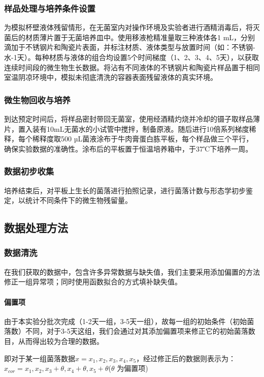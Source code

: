 \documentclass[12pt,a4paper]{ctexart}
\begin{document}
\subsubsection{样品处理与培养条件设置}

为模拟杯壁液体残留情形，在无菌室内对操作环境及实验者进行酒精消毒后，将灭菌后的材质薄片置于无菌培养皿中。使用移液枪精准量取三种液体各1 mL，分别滴加于不锈钢片和陶瓷片表面，并标注材质、液体类型与放置时间（如：不锈钢-水-1天）。每种材质与液体的组合均设置5个时间梯度（1、2、3、4、5天），以获取连续时间段的微生物生长数据。将沾有不同液体的不锈钢片和陶瓷片样品置于相同室温阴凉环境中，模拟未彻底清洗的容器表面残留液体的真实环境。

\subsubsection{微生物回收与培养}

到达预定时间后，将样品密封带回无菌室，使用经酒精灼烧并冷却的镊子取样品薄片，置入装有10mL无菌水的小试管中搅拌，制备原液。随后进行10倍系列梯度稀释，每个稀释度取500 µL菌液涂布于牛肉膏蛋白胨平板，每个样品做三个平行，确保实验数据的准确性。涂布后的平板置于恒温培养箱中，于37℃下培养一周。

\subsubsection{数据初步收集}

培养结束后，对平板上生长的菌落进行拍照记录，进行菌落计数与形态学初步鉴定，以统计不同条件下的微生物残留量。


\subsection{数据处理方法}

\subsubsection{数据清洗}
在我们获取的数据中，包含许多异常数据与缺失值，我们主要采用添加偏置的方法修正一组异常项；同时使用函数拟合的方式填补缺失值。
\paragraph{偏置项}
由于本实验分批次完成（1-2天一组，3-5天一组），故每一组的初始条件（初始菌落数）不同，对于3-5天这组，我们会通过对其添加偏置项来修正它的初始菌落数目，从而得出较为合理的数据。


即对于某一组菌落数据${x}={x_1,x_2,x_3,x_4,x_5}$，经过修正后的数据则表示为：$x_{cor}=x_1,x_2,x_3+\theta,x_4+\theta,x_5+\theta $($\theta$ 为偏置项)
\end{document}
